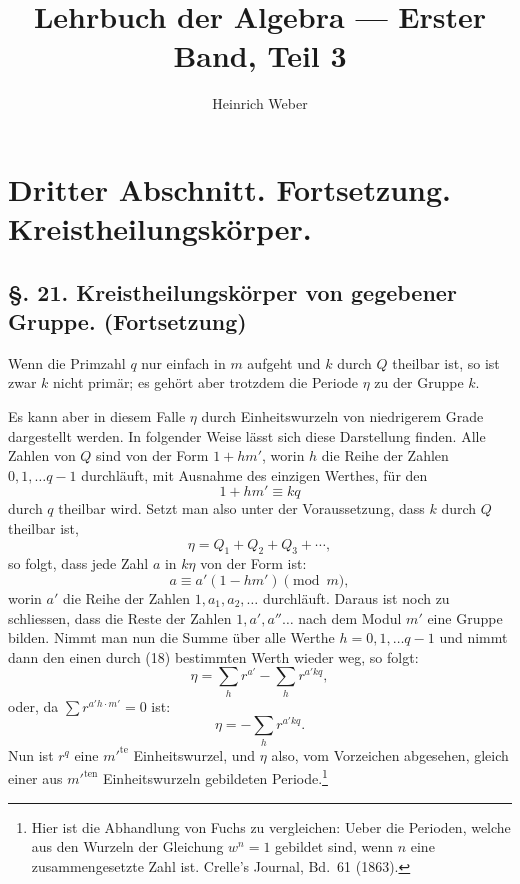 \documentclass[12pt,a4paper]{article}
\title{Lehrbuch der Algebra --- Erster Band, Teil 3}
\author{Heinrich Weber}
\date{}
\theoremstyle{plain}
\theoremstyle{definition}
\theoremstyle{remark}
\begin{document}
\maketitle

\section*{Dritter Abschnitt. Fortsetzung. Kreistheilungskörper.}

\subsection*{\S. 21. Kreistheilungskörper von gegebener Gruppe. (Fortsetzung)}

\noindent
Wenn die Primzahl $q$ nur einfach in $m$ aufgeht und $k$ durch
$Q$ theilbar ist, so ist zwar $k$ nicht primär; es gehört aber trotzdem
die Periode $\eta$ zu der Gruppe $k$.

Es kann aber in diesem Falle $\eta$ durch Einheitswurzeln von
niedrigerem Grade dargestellt werden. In folgender Weise lässt
sich diese Darstellung finden. Alle Zahlen von $Q$ sind von der
Form $1 + hm'$, worin $h$ die Reihe der Zahlen $0,1,\ldots q-1$
durchläuft, mit Ausnahme des einzigen Werthes, für den
\begin{equation}\tag{18}
1 + hm' \equiv kq
\end{equation}
durch $q$ theilbar wird. Setzt man also unter der Voraussetzung,
dass $k$ durch $Q$ theilbar ist,
\[
\eta = Q_1 + Q_2 + Q_3 + \cdots,
\]
so folgt, dass jede Zahl $a$ in $k\eta$ von der Form ist:
\begin{equation}\tag{19}
a \equiv a'(1 - hm') \pmod{m},
\end{equation}
worin $a'$ die Reihe der Zahlen $1, a_1, a_2, \ldots$ durchläuft. Daraus
ist noch zu schliessen, dass die Reste der Zahlen $1, a', a''\ldots$
nach dem Modul $m'$ eine Gruppe bilden. Nimmt man nun die
Summe über alle Werthe $h = 0, 1,\ldots q-1$ und nimmt dann
den einen durch (18) bestimmten Werth wieder weg, so folgt:
\[
\eta = \sum_{h} r^{a'} - \sum_{h} r^{a'kq},
\]
oder, da $\sum r^{a'h\cdot m'} = 0$ ist:
\[
\eta = -\sum_{h} r^{a'kq}.
\]
Nun ist $r^q$ eine $m'^{\text{te}}$ Einheitswurzel, und $\eta$ also, vom Vorzeichen abgesehen, gleich einer aus $m'^{\text{ten}}$ Einheitswurzeln gebildeten Periode.\footnote{Hier ist die Abhandlung von Fuchs zu vergleichen: Ueber die Perioden, welche aus den Wurzeln der Gleichung $w^n = 1$ gebildet sind, wenn $n$ eine zusammengesetzte Zahl ist. Crelle's Journal, Bd.~61 (1863).}
\end{document}
